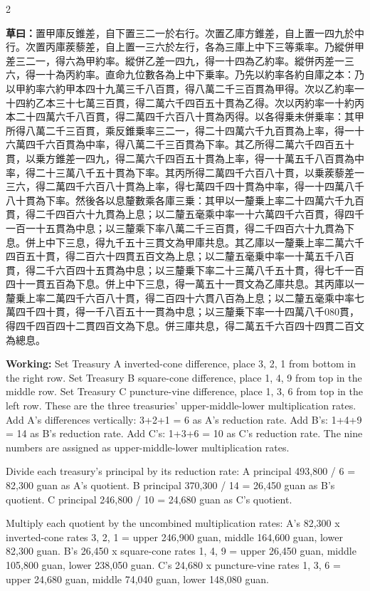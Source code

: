 \documentclass[11pt,a4paper]{article}
\newcommand{\WorkingText}[1]{\par\noindent\textbf{草曰：}#1\par}
\newcommand{\WorkingEn}[1]{\par\noindent\textbf{Working:} #1\par}
\begin{document}
\begin{paracol}{2}
\WorkingText{置甲庫反錐差，自下置三二一於右行。次置乙庫方錐差，自上置一四九於中行。次置丙庫蒺藜差，自上置一三六於左行，各為三庫上中下三等乘率。乃縱併甲差三二一，得六為甲約率。縱併乙差一四九，得一十四為乙約率。縱併丙差一三六，得一十為丙約率。直命九位數各為上中下乗率。乃先以約率各約自庫之本：乃以甲約率六約甲本四十九萬三千八百貫，得八萬二千三百貫為甲得。次以乙約率一十四約乙本三十七萬三百貫，得二萬六千四百五十貫為乙得。次以丙約率一十約丙本二十四萬六千八百貫，得二萬四千六百八十貫為丙得。以各得乗未併乗率：其甲所得八萬二千三百貫，乘反錐乗率三二一，得二十四萬六千九百貫為上率，得一十六萬四千六百貫為中率，得八萬二千三百貫為下率。其乙所得二萬六千四百五十貫，以乗方錐差一四九，得二萬六千四百五十貫為上率，得一十萬五千八百貫為中率，得二十三萬八千五十貫為下率。其丙所得二萬四千六百八十貫，以乗蒺藜差一三六，得二萬四千六百八十貫為上率，得七萬四千四十貫為中率，得一十四萬八千八十貫為下率。然後各以息釐數乘各庫三乗：其甲以一釐乗上率二十四萬六千九百貫，得二千四百六十九貫為上息；以二釐五毫乘中率一十六萬四千六百貫，得四千一百一十五貫為中息；以三釐乘下率八萬二千三百貫，得二千四百六十九貫為下息。併上中下三息，得九千五十三貫文為甲庫共息。其乙庫以一釐乗上率二萬六千四百五十貫，得二百六十四貫五百文為上息；以二釐五毫乗中率一十萬五千八百貫，得二千六百四十五貫為中息；以三釐乗下率二十三萬八千五十貫，得七千一百四十一貫五百為下息。併上中下三息，得一萬五十一貫文為乙庫共息。其丙庫以一釐乗上率二萬四千六百八十貫，得二百四十六貫八百為上息；以二釐五毫乘中率七萬四千四十貫，得一千八百五十一貫為中息；以三釐乗下率一十四萬八千080貫，得四千四百四十二貫四百文為下息。併三庫共息，得二萬五千六百四十四貫二百文為總息。}
\switchcolumn
\WorkingEn{Set Treasury A inverted-cone difference, place 3, 2, 1 from bottom in the right row. Set Treasury B square-cone difference, place 1, 4, 9 from top in the middle row. Set Treasury C puncture-vine difference, place 1, 3, 6 from top in the left row. These are the three treasuries' upper-middle-lower multiplication rates. Add A's differences vertically: 3+2+1 = 6 as A's reduction rate. Add B's: 1+4+9 = 14 as B's reduction rate. Add C's: 1+3+6 = 10 as C's reduction rate. The nine numbers are assigned as upper-middle-lower multiplication rates.

Divide each treasury's principal by its reduction rate: A principal 493,800 / 6 = 82,300 guan as A's quotient. B principal 370,300 / 14 = 26,450 guan as B's quotient. C principal 246,800 / 10 = 24,680 guan as C's quotient.

Multiply each quotient by the uncombined multiplication rates: A's 82,300 x inverted-cone rates 3, 2, 1 = upper 246,900 guan, middle 164,600 guan, lower 82,300 guan. B's 26,450 x square-cone rates 1, 4, 9 = upper 26,450 guan, middle 105,800 guan, lower 238,050 guan. C's 24,680 x puncture-vine rates 1, 3, 6 = upper 24,680 guan, middle 74,040 guan, lower 148,080 guan.

}
\end{paracol}
\end{document}
